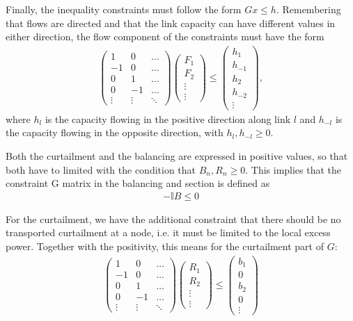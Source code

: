 \documentclass[english,twoside,a4paper,11pt]{article}
\numberwithin{equation}{section}
\begin{document}
Finally, the inequality constraints must follow the form $G x\leq
h$. Remembering that flows are directed and that the link capacity
can have different values in either direction, the flow component of
the constraints must have the form
\begin{align}
\left(
\begin{matrix}
1 & 0 & \hdots \\
-1 & 0 & \hdots \\
0 & 1  & \hdots \\
0 & -1  & \hdots \\
\vdots & \vdots & \ddots 
\end{matrix}
\right)
\left(
\begin{matrix}
F_1 \\
F_2 \\
\vdots \\
\vdots
\end{matrix}
\right)
\leq
\left(
\begin{matrix}
h_1 \\
h_{-1} \\
h_2 \\
h_{-2}\\
\vdots
\end{matrix}
\right),
\label{eq:capc}
\end{align}
where $h_l$ is the capacity flowing in the positive direction along
link $l$ and $h_{-l}$ is the capacity flowing in the opposite
direction, with $h_l, h_{-l} \geq 0$.

Both the curtailment and the balancing are expressed in positive
values, so that both have to limited with the condition that $B_n, R_n
\geq 0$. This implies that the constraint G matrix in the
balancing and section is defined as
\begin{align}
-\mathbb{I} B \leq 0
\label{eq:bal+}
\end{align}

For the curtailment, we have the additional constraint that there
should be no transported curtailment at a node, i.e. it must be
limited to the local excess power. Together with the positivity, this
means for the curtailment part of $G$:
\begin{align}
\left(
\begin{matrix}
1 & 0 & \hdots \\
-1 & 0 & \hdots \\
0 & 1  & \hdots \\
0 & -1  & \hdots \\
\vdots & \vdots & \ddots 
\end{matrix}
\right)
\left(
\begin{matrix}
R_1 \\
R_2 \\
\vdots \\
\vdots
\end{matrix}
\right)
\leq
\left(
\begin{matrix}
b_1 \\
0 \\
b_2 \\
0\\
\vdots
\end{matrix}
\right)
\label{eq:cur+}
\end{align}
\end{document}
